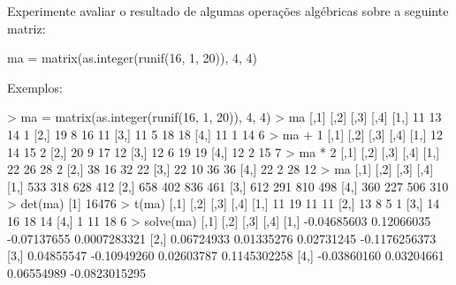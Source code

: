 \documentclass{exam}
\begin{document}
\begin{questions}
\question Experimente avaliar o resultado de algumas operações algébricas sobre a seguinte matriz:
\begin{rcode}
	ma = matrix(as.integer(runif(16, 1, 20)), 4, 4)
\end{rcode}
Exemplos:

\begin{solution}
	\begin{rcode}
		> ma = matrix(as.integer(runif(16, 1, 20)), 4, 4)
		> ma
		      [,1] [,2] [,3] [,4]
		[1,]   11   13   14    1
		[2,]   19    8   16   11
		[3,]   11    5   18   18
		[4,]   11    1   14    6
		> ma + 1
		     [,1] [,2] [,3] [,4]
		[1,]   12   14   15    2
		[2,]   20    9   17   12
		[3,]   12    6   19   19
		[4,]   12    2   15    7
		> ma * 2
		     [,1] [,2] [,3] [,4]
		[1,]   22   26   28    2
		[2,]   38   16   32   22
		[3,]   22   10   36   36
		[4,]   22    2   28   12
		> ma %
		     [,1] [,2] [,3] [,4]
		[1,]  533  318  628  412
		[2,]  658  402  836  461
		[3,]  612  291  810  498
		[4,]  360  227  506  310
		> det(ma)
		[1] 16476
		> t(ma)
		     [,1] [,2] [,3] [,4]
		[1,]   11   19   11   11
		[2,]   13    8    5    1
		[3,]   14   16   18   14
		[4,]    1   11   18    6
		> solve(ma)
		            [,1]        [,2]        [,3]          [,4]
		[1,] -0.04685603  0.12066035 -0.07137655  0.0007283321
		[2,]  0.06724933  0.01335276  0.02731245 -0.1176256373
		[3,]  0.04855547 -0.10949260  0.02603787  0.1145302258
		[4,] -0.03860160  0.03204661  0.06554989 -0.0823015295
		
	\end{rcode}
\end{solution}

%

\end{questions}
\end{document}

